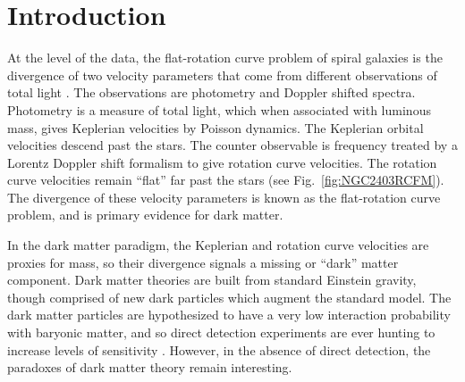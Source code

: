 \documentclass[reprint,%
 amsmath,amssymb,
 aps,
]{revtex4-1}
\begin{document}
\section{Introduction  \label{sec:uno}}



  At the level of the data, the flat-rotation curve problem of spiral galaxies is  the divergence of two velocity parameters that come  from  different    observations of total light
 \cite{Rub,Bosma,1985ApJAlbada}. 
 The  observations   are photometry and Doppler shifted spectra. 
 Photometry is a measure of total light, which when associated with luminous mass, 
 gives Keplerian velocities by
Poisson  dynamics.  
The Keplerian orbital  velocities   descend  past   the stars. 
The counter observable is frequency treated by a Lorentz  Doppler shift formalism to give   rotation curve velocities. 
The rotation curve velocities remain ``flat''  far past the stars (see Fig.~\ref{fig:NGC2403RCFM}). The divergence of these velocity parameters is   known as the 
  flat-rotation curve problem, and  is
 primary evidence for dark matter.

 
In the dark matter paradigm,    the   Keplerian  and   rotation curve velocities are  proxies for mass,    so their divergence signals a   missing or ``dark'' matter component. 
Dark matter theories are built from standard Einstein gravity, though      comprised of new dark particles  which augment the standard model. The  dark matter  particles are hypothesized to    have a very low interaction probability with baryonic matter, and so   direct detection experiments are ever hunting to increase levels of sensitivity  \cite{Cebrian:2022brv}. However, in the absence of  direct detection,   the paradoxes of dark matter theory remain    interesting.   
 
 
\end{document}

